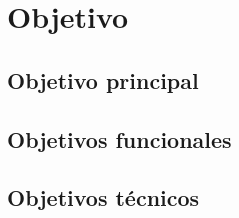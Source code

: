 \chapter{Objetivo}
\label{cap:Objetivo}

\section{Objetivo principal}
\label{sec:ObjetivoP}

\section{Objetivos funcionales}
\label{sec:ObjetivosF}

\section{Objetivos técnicos}
\label{sec:ObjetivosT}